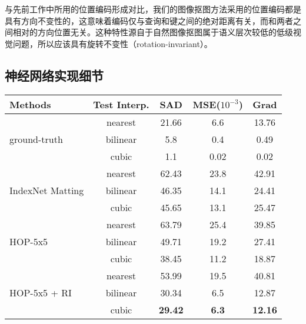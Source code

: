 与先前工作中所用的位置编码\cite{vaswani2017attention,dai2019transformer,ramachandran2019stand}形成对比，我们的图像抠图方法采用的位置编码都是具有方向不变性的，这意味着编码仅与查询和键之间的绝对距离有关，而和两者之间相对的方向位置无关。这种特性源自于自然图像抠图属于语义层次较低的低级视觉问题，所以应该具有旋转不变性（rotation-invariant）。

\subsection{神经网络实现细节}

\begin{table}[t]
	\setlength{\tabcolsep}{15pt}
	\centering
	\begin{tabular}{l|cccc}  
		\toprule
		Methods & Test Interp.& SAD & MSE($10^{-3}$)  & Grad\\
		\midrule
		\multirow{3}{*}{ground-truth}&nearest& 21.66& 6.6& 13.76 \\
		& bilinear&5.8& 0.4&0.49 \\
		& cubic & 1.1& 0.02& 0.02\\
		\midrule
		\multirow{3}{*}{IndexNet Matting \cite{lu2019indices}}&nearest& 62.43& 23.8& 42.91 \\
		& bilinear&46.35& 14.1&24.41 \\
		& cubic & 45.65& 13.1& 25.47\\
		\midrule
		\multirow{3}{*}{HOP-5x5}&nearest&63.79&25.4&39.85\\
		& bilinear & 49.71 & 19.2 & 27.41\\
		& cubic & 38.45& 11.2  &18.87\\
		\midrule
		\multirow{3}{*}{HOP-5x5 + RI}  &nearest& 53.99 &19.5  &40.81\\
		& bilinear &30.34&6.5 &12.87\\
		& cubic & \textbf{29.42} & \textbf{6.3}&\textbf{12.16}\\
		\bottomrule
	\end{tabular}
	\label{tab5:RI}
\end{table}

